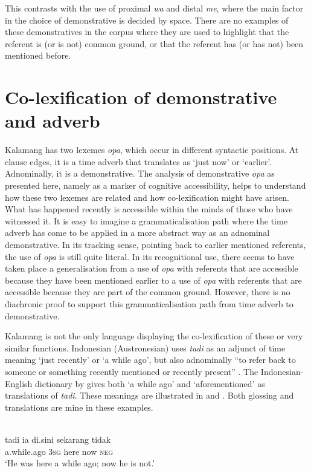 \documentclass[output=paper,colorlinks,citecolor=brown]{langscibook}
\begin{document}
This contrasts with the use of proximal \textit{wa} and distal \textit{me}, where the main factor in the choice of demonstrative is decided by space. There are no examples of these demonstratives in the corpus where they are used to highlight that the referent is (or is not) common ground, or that the referent has (or has not) been mentioned before.


\section{Co-lexification of demonstrative and adverb}
\label{sec:typ}
Kalamang has two lexemes \textit{opa}, which occur in different syntactic positions. At clause edges, it is a time adverb that translates as `just now' or `earlier'. Adnominally, it is a demonstrative. The analysis of demonstrative \textit{opa} as presented here, namely as a marker of cognitive accessibility, helps to understand how these two lexemes are related and how co-lexification might have arisen. What has happened recently is accessible within the minds of those who have witnessed it. It is easy to imagine a grammaticalisation path where the time adverb has come to be applied in a more abstract way as an adnominal demonstrative. In its tracking sense, pointing back to earlier mentioned referents, the use of \textit{opa} is still quite literal. In its recognitional use, there seems to have taken place a generalisation from a use of \textit{opa} with referents that are accessible because they have been mentioned earlier to a use of \textit{opa} with referents that are accessible because they are part of the common ground. However, there is no diachronic proof to support this grammaticalisation path from time adverb to demonstrative.

Kalamang is not the only language displaying the co-lexification of these or very similar functions. Indonesian (Austronesian) uses \textit{tadi} as an adjunct of time meaning `just recently' or `a while ago', but also adnominally ``to refer back to someone or something recently mentioned or recently present'' \citep[135]{Sneddon2012}. The Indonesian-English dictionary by \citet{EcholsEtAl1989} gives both `a while ago' and `aforementioned' as translations of \textit{tadi}. These meanings are illustrated in  and . Both glossing and translations are mine in these examples.

\ea \label{exe:tadi}
\\
\gll tadi ia di.sini sekarang tidak\\
a.while.ago \textsc{3sg} here now \textsc{neg}\\
\glt `He was here a while ago; now he is not.'
\z
\end{document}
